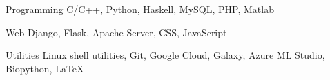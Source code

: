 
\vspace{-0.3cm}


\begin{cvskills}


  \cvskill
  {Programming}
  {C/C++, Python, Haskell, MySQL, PHP, Matlab}


  \cvskill
  {Web}
  {Django, Flask, Apache Server, CSS, JavaScript }


  \cvskill
  {Utilities}
  {Linux shell utilities, Git, Google Cloud,
    Galaxy, Azure ML Studio, Biopython, \LaTeX}


\end{cvskills}

